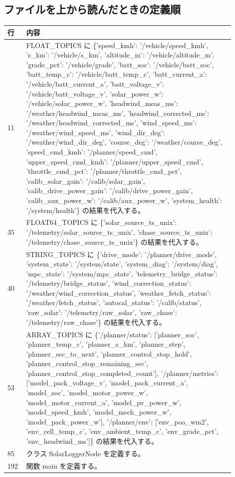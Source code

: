 \documentclass[a4paper,11pt]{article}
\begin{document}
        \subsection{ファイルを上から読んだときの定義順}
            \begin{longtable}{p{0.07\linewidth} p{0.84\linewidth}}
            \toprule
            行 & 内容 \\
            \midrule
            11 & FLOAT\_TOPICS に \{'speed\_kmh': '/vehicle/speed\_kmh', 's\_km': '/vehicle/s\_km', 'altitude\_m': '/vehicle/altitude\_m', 'grade\_pct': '/vehicle/grade', 'batt\_soc': '/vehicle/batt\_soc', 'batt\_temp\_c': '/vehicle/batt\_temp\_c', 'batt\_current\_a': '/vehicle/batt\_current\_a', 'batt\_voltage\_v': '/vehicle/batt\_voltage\_v', 'solar\_power\_w': '/vehicle/solar\_power\_w', 'headwind\_meas\_ms': '/weather/headwind\_meas\_ms', 'headwind\_corrected\_ms': '/weather/headwind\_corrected\_ms', 'wind\_speed\_ms': '/weather/wind\_speed\_ms', 'wind\_dir\_deg': '/weather/wind\_dir\_deg', 'course\_deg': '/weather/course\_deg', 'speed\_cmd\_kmh': '/planner/speed\_cmd', 'upper\_speed\_cmd\_kmh': '/planner/upper\_speed\_cmd', 'throttle\_cmd\_pct': '/planner/throttle\_cmd\_pct', 'calib\_solar\_gain': '/calib/solar\_gain', 'calib\_drive\_power\_gain': '/calib/drive\_power\_gain', 'calib\_aux\_power\_w': '/calib/aux\_power\_w', 'system\_health': '/system/health'\} の結果を代入する。 \\
35 & FLOAT64\_TOPICS に \{'solar\_source\_ts\_unix': '/telemetry/solar\_source\_ts\_unix', 'chase\_source\_ts\_unix': '/telemetry/chase\_source\_ts\_unix'\} の結果を代入する。 \\
40 & STRING\_TOPICS に \{'drive\_mode': '/planner/drive\_mode', 'system\_state': '/system/state', 'system\_diag': '/system/diag', 'mpc\_state': '/system/mpc\_state', 'telemetry\_bridge\_status': '/telemetry/bridge\_status', 'wind\_correction\_status': '/weather/wind\_correction\_status', 'weather\_fetch\_status': '/weather/fetch\_status', 'autocal\_status': '/calib/status', 'raw\_solar': '/telemetry/raw\_solar', 'raw\_chase': '/telemetry/raw\_chase'\} の結果を代入する。 \\
53 & ARRAY\_TOPICS に \{'/planner/status': ['planner\_soc', 'planner\_temp\_c', 'planner\_s\_km', 'planner\_step', 'planner\_sec\_to\_next', 'planner\_control\_stop\_hold', 'planner\_control\_stop\_remaining\_sec', 'planner\_control\_stop\_completed\_count'], '/planner/metrics': ['model\_pack\_voltage\_v', 'model\_pack\_current\_a', 'model\_soc', 'model\_motor\_power\_w', 'model\_motor\_current\_a', 'model\_pv\_power\_w', 'model\_speed\_kmh', 'model\_mech\_power\_w', 'model\_pack\_power\_w'], '/planner/env': ['env\_poa\_wm2', 'env\_cell\_temp\_c', 'env\_ambient\_temp\_c', 'env\_grade\_pct', 'env\_headwind\_ms']\} の結果を代入する。 \\
85 & クラス SolarLoggerNode を定義する。 \\
192 & 関数 main を定義する。 \\
            \bottomrule
            \end{longtable}
\end{document}

